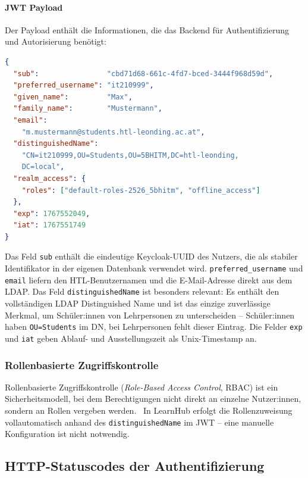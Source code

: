 \clearpage
\paragraph{JWT Payload}

Der Payload enthält die Informationen, die das Backend für
Authentifizierung und Autorisierung benötigt:

\begin{lstlisting}[language=json, caption={JWT Payload aus dem HTL Keycloak-Realm},
                   label={lst:jwt-payload}]
{
  "sub":                "cbd71d68-661c-4fd7-bced-3444f968d59d",
  "preferred_username": "it210999",
  "given_name":         "Max",
  "family_name":        "Mustermann",
  "email":
    "m.mustermann@students.htl-leonding.ac.at",
  "distinguishedName":
    "CN=it210999,OU=Students,OU=5BHITM,DC=htl-leonding,
    DC=local",
  "realm_access": {
    "roles": ["default-roles-2526_5bhitm", "offline_access"]
  },
  "exp": 1767552049,
  "iat": 1767551749
}
\end{lstlisting}

Das Feld \texttt{sub} enthält die eindeutige Keycloak-UUID des Nutzers,
die als stabiler Identifikator in der eigenen Datenbank verwendet wird.
\texttt{preferred\_username} und \texttt{email} liefern den
HTL-Benutzernamen und die E-Mail-Adresse direkt aus dem LDAP. Das Feld
\texttt{distinguishedName} ist besonders relevant: Es enthält den
vollständigen LDAP Distinguished Name und ist das einzige zuverlässige
Merkmal, um Schüler:innen von Lehrpersonen zu unterscheiden --
Schüler:innen haben \texttt{OU=Students} im DN, bei Lehrpersonen fehlt
dieser Eintrag. Die Felder \texttt{exp} und \texttt{iat} geben Ablauf-
und Ausstellungszeit als Unix-Timestamp an.~\cite{jwt-rfc}

\subsubsection{Rollenbasierte Zugriffskontrolle}

Rollenbasierte Zugriffskontrolle (\textit{Role-Based Access Control},
RBAC) ist ein Sicherheitsmodell, bei dem Berechtigungen nicht direkt
an einzelne Nutzer:innen, sondern an Rollen vergeben werden.~\cite{quarkus-security-jwt}
In LearnHub erfolgt die Rollenzuweisung vollautomatisch anhand des
\texttt{distinguishedName} im JWT -- eine manuelle Konfiguration ist
nicht notwendig.

\subsection{HTTP-Statuscodes der Authentifizierung}


